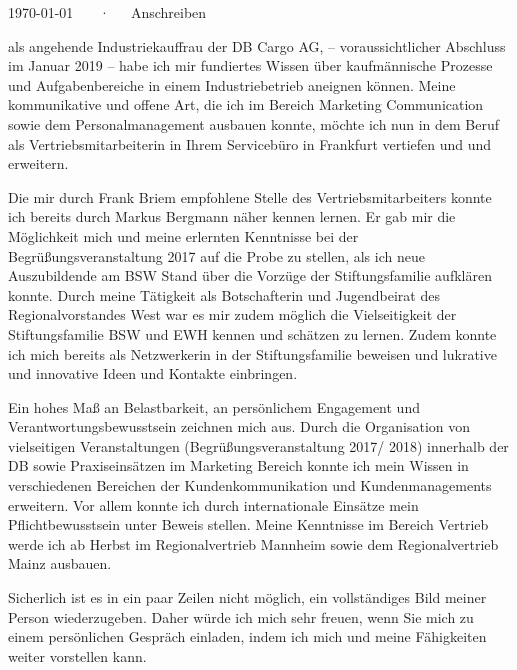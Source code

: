 \documentclass[11pt, a4paper]{awesome-cv}
\begin{document}
\makecvheader[R]

\makecvfooter
  {\today}
  {\getfullname~~~·~~~Anschreiben}
  {}

\makelettertitle

\begin{cvletter}

als angehende Industriekauffrau der DB Cargo AG, – voraussichtlicher Abschluss im Januar 2019 – habe ich mir fundiertes Wissen über kaufmännische Prozesse und Aufgabenbereiche in einem Industriebetrieb aneignen können. Meine kommunikative und offene Art, die ich im Bereich Marketing Communication sowie dem Personalmanagement ausbauen konnte, möchte ich nun in dem Beruf als Vertriebsmitarbeiterin in Ihrem Servicebüro in Frankfurt vertiefen und und erweitern.

Die mir durch Frank Briem empfohlene Stelle des Vertriebsmitarbeiters konnte ich bereits durch Markus Bergmann näher kennen lernen. Er gab mir die Möglichkeit mich und meine erlernten Kenntnisse bei der Begrüßungsveranstaltung 2017 auf die Probe zu stellen, als ich neue Auszubildende am BSW Stand über die Vorzüge der Stiftungsfamilie aufklären konnte.
Durch meine Tätigkeit als Botschafterin und Jugendbeirat des Regionalvorstandes West war es mir zudem möglich die Vielseitigkeit der Stiftungsfamilie BSW und EWH kennen und schätzen zu lernen.
Zudem konnte ich mich bereits als Netzwerkerin in der Stiftungsfamilie beweisen und lukrative und innovative Ideen und Kontakte einbringen. 

Ein hohes Maß an Belastbarkeit, an persönlichem Engagement und Verantwortungsbewusstsein zeichnen mich aus. Durch die Organisation von vielseitigen  Veranstaltungen (Begrüßungsveranstaltung 2017/ 2018) innerhalb der DB sowie Praxiseinsätzen im Marketing Bereich konnte ich mein Wissen in verschiedenen Bereichen der Kundenkommunikation und Kundenmanagements erweitern. Vor allem konnte ich durch internationale Einsätze mein Pflichtbewusstsein unter Beweis stellen. 
Meine Kenntnisse im Bereich Vertrieb werde ich ab Herbst im Regionalvertrieb Mannheim sowie dem Regionalvertrieb Mainz ausbauen.

Sicherlich ist es in ein paar Zeilen nicht möglich, ein vollständiges Bild meiner Person wiederzugeben. Daher würde ich mich sehr freuen, wenn Sie mich zu einem persönlichen Gespräch einladen, indem ich mich und meine Fähigkeiten weiter vorstellen kann.


\end{cvletter}


\makeletterclosing
\end{document}
